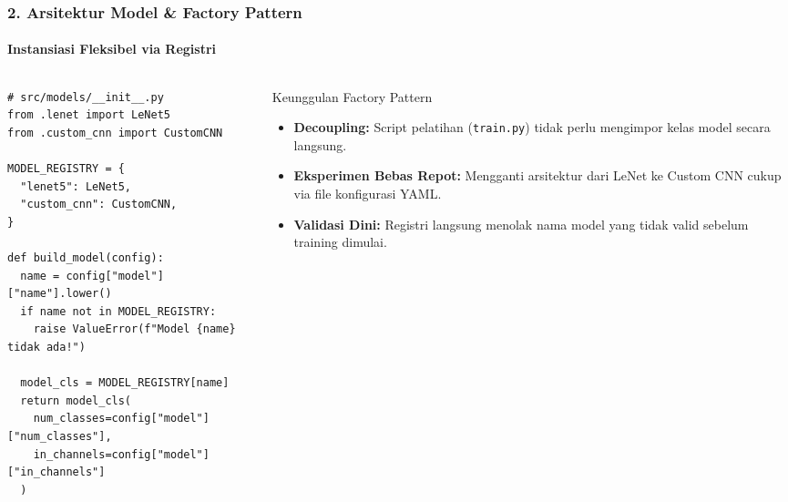 \documentclass[t,aspectratio=169,xcolor=dvipsnames]{beamer}
\begin{document}
\begin{frame}[fragile]
  \frametitle{2. Arsitektur Model \& Factory Pattern}
  \framesubtitle{Instansiasi Fleksibel via Registri}

  \begin{columns}[t]
    \begin{column}{0.52\textwidth}
\begin{lstlisting}[style=py]
# src/models/__init__.py
from .lenet import LeNet5
from .custom_cnn import CustomCNN

MODEL_REGISTRY = {
  "lenet5": LeNet5,
  "custom_cnn": CustomCNN,
}

def build_model(config):
  name = config["model"]["name"].lower()
  if name not in MODEL_REGISTRY:
    raise ValueError(f"Model {name} tidak ada!")
  
  model_cls = MODEL_REGISTRY[name]
  return model_cls(
    num_classes=config["model"]["num_classes"],
    in_channels=config["model"]["in_channels"]
  )
\end{lstlisting}
    \end{column}

    \begin{column}{0.45\textwidth}
      \begin{exampleblock}{Keunggulan Factory Pattern}
        \small
        \begin{itemize}\setlength{\itemsep}{3pt}
          \item \textbf{Decoupling:} Script pelatihan (\texttt{train.py}) tidak perlu mengimpor kelas model secara langsung.
          \item \textbf{Eksperimen Bebas Repot:} Mengganti arsitektur dari LeNet ke Custom CNN cukup via file konfigurasi YAML.
          \item \textbf{Validasi Dini:} Registri langsung menolak nama model yang tidak valid sebelum training dimulai.
        \end{itemize}
      \end{exampleblock}
    \end{column}
  \end{columns}
\end{frame}
\end{document}

